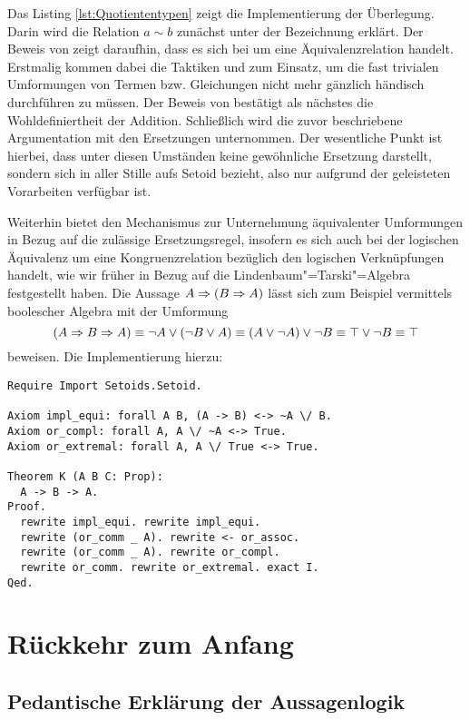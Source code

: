 Das Listing \ref{lst:Quotiententypen} zeigt die Implementierung
der Überlegung. Darin wird die Relation $a\sim b$ zunächst unter
der Bezeichnung  erklärt. Der Beweis von 
zeigt daraufhin, dass es sich bei  um eine Äquivalenzrelation
handelt. Erstmalig kommen dabei die Taktiken  und
 zum Einsatz, um die fast trivialen Umformungen
von Termen bzw. Gleichungen nicht mehr gänzlich händisch durchführen zu
müssen. Der Beweis von  bestätigt als nächstes die
Wohldefiniertheit der Addition. Schließlich wird die zuvor beschriebene
Argumentation mit den Ersetzungen unternommen. Der wesentliche Punkt ist
hierbei, dass  unter diesen Umständen keine gewöhnliche
Ersetzung darstellt, sondern sich in aller Stille aufs Setoid bezieht,
also nur aufgrund der geleisteten Vorarbeiten verfügbar ist.

Weiterhin bietet  den Mechanismus zur Unternehmung
äquivalenter Umformungen in Bezug auf die zulässige Ersetzungsregel,
insofern es sich auch bei der logischen Äquivalenz um eine
Kongruenzrelation bezüglich den logischen Verknüpfungen handelt, wie
wir früher in Bezug auf die Lindenbaum"=Tarski"=Algebra festgestellt haben.
Die Aussage $A\Rightarrow (B\Rightarrow A)$ lässt sich zum Beispiel vermittels
boolescher Algebra mit der Umformung
\[(A\Rightarrow B\Rightarrow A)\equiv \lnot A\lor (\lnot B\lor A)\equiv
(A\lor\lnot A)\lor\lnot B\equiv \top\lor\lnot B\equiv\top\]
beweisen. Die Implementierung hierzu:
\begin{lstlisting}[language=Coq, xleftmargin=\mathindent]
Require Import Setoids.Setoid.

Axiom impl_equi: forall A B, (A -> B) <-> ~A \/ B.
Axiom or_compl: forall A, A \/ ~A <-> True.
Axiom or_extremal: forall A, A \/ True <-> True.

Theorem K (A B C: Prop):
  A -> B -> A.
Proof.
  rewrite impl_equi. rewrite impl_equi.
  rewrite (or_comm _ A). rewrite <- or_assoc.
  rewrite (or_comm _ A). rewrite or_compl.
  rewrite or_comm. rewrite or_extremal. exact I.
Qed.
\end{lstlisting}

\newpage
\section{Rückkehr zum Anfang}

\subsection{Pedantische Erklärung der Aussagenlogik}

